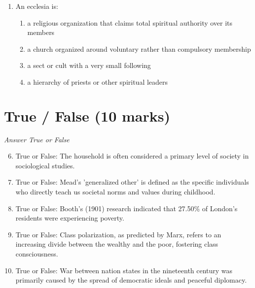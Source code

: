 \documentclass[12pt]{article}
\begin{document}
\begin{enumerate}[label=\arabic*.]
\begin{enumerate}[label=(\alph*)]
    \item the white population did not believe in liberty, equality, and democracy
    \item they wanted to retain a strong sense of their original ethnic identity
    \item they were not prepared to leave the Southern states and move to North America
    \item the promise of citizenship was contradicted by continued discrimination
\end{enumerate}
\item An ecclesia is:
\begin{enumerate}[label=(\alph*)]
    \item a religious organization that claims total spiritual authority over its members
    \item a church organized around voluntary rather than compulsory membership
    \item a sect or cult with a very small following
    \item a hierarchy of priests or other spiritual leaders
\end{enumerate}
\end{enumerate}

\section*{True / False (10 marks)}
\textit{Answer True or False}
\begin{enumerate}[label=\arabic*.]
\setcounter{enumi}{5}
\item True or False: The household is often considered a primary level of society in sociological studies.
\item True or False: Mead's 'generalized other' is defined as the specific individuals who directly teach us societal norms and values during childhood.
\item True or False: Booth's (1901) research indicated that 27.50\% of London's residents were experiencing poverty.
\item True or False: Class polarization, as predicted by Marx, refers to an increasing divide between the wealthy and the poor, fostering class consciousness.
\item True or False: War between nation states in the nineteenth century was primarily caused by the spread of democratic ideals and peaceful diplomacy.
\end{enumerate}
\end{document}
